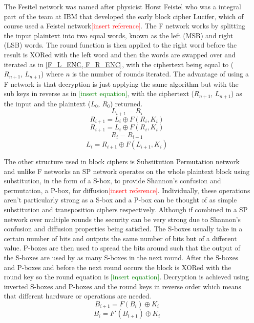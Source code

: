 \documentclass[12pt,twoside,a4paper]{report}
\begin{document}
    The Fesitel network was named after physicist Horst Feistel who was a integral part of the team at IBM that developed the early block cipher Lucifer, which of course used a Feistel network\textcolor{red}{[insert reference]}. The F network works by splitting the input plaintext into two equal words, known as the left (MSB) and right (LSB) words. The round function is then applied to the right word before the result is XORed with the left word and then the words are swapped over and iterated as in \autoref{F_L_ENC, F_R_ENC}, with the ciphertext being equal to ($R_{n+1}$, $L_{n+1}$) where $n$ is the number of rounds iterated. The advantage of using a F network is that decryption is just applying the same algorithm but with the sub keys in reverse as in \textcolor{green}{[insert equation]}, with the ciphertext ($R_{n+1}$, $L_{n+1}$) as the input and the plaintext ($L_0$, $R_0$) returned.
    \begin{equation}
    \label{F_L_ENC}
    L_{i+1} = R_i
    \end{equation}
    \begin{equation}
    \label{F_R_ENC}
    R_{i+1} = L_i \oplus F(R_i, K_i)
    \end{equation}
    \[R_{i+1} = L_i \oplus F(R_i, K_i)\]
    \[R_i = R_{i+1}\]
    \[L_i = R_{i+1} \oplus F(L_{i+1}, K_i)\]
    
    The other structure used in block ciphers is Substitution Permutation network and unlike F networks an SP network operates on the whole plaintext block using substitution, in the form of a S-box, to provide Shannon's confusion and permutation, a P-box, for diffusion\textcolor{red}{[insert reference]}. Individually, these operations aren't particularly strong as a S-box and a P-box can be thought of as simple substitution and transposition ciphers respectively. Although if combined in a SP network over multiple rounds the security can be very strong due to Shannon's confusion and diffusion properties being satisfied. The S-boxes usually take in a certain number of bits and outputs the same number of bits but of a different value. P-boxes are then used to spread the bits around such that the output of the S-boxes are used by as many S-boxes in the next round. After the S-boxes and P-boxes and before the next round occurs the block is XORed with the round key so the round equation is \textcolor{green}{[insert equation]}. Decryption is achieved using inverted S-boxes and P-boxes and the round keys in reverse order which means that different hardware or operations are needed.
    \[B_{i+1} = F(B_i) \oplus K_i\]
    \[B_i = F'(B_{i+1}) \oplus K_i\] 
    
\end{document}
